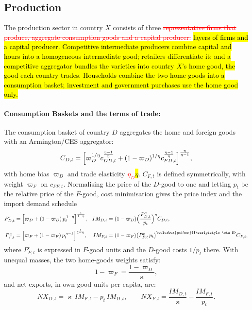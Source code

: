 \subsection{Production}
The production sector in country $X$ consists of three \textcolor{red}{\st{representative firms that produce, aggregate consumption goods and a capital producer.}} \hl{layers of firms and a capital producer. Competitive intermediate producers combine capital and hours into a homogeneous intermediate good; retailers differentiate it; and a competitive aggregator bundles the varieties into country $X$'s home good, the good each country trades. Households combine the two home goods into a consumption basket; investment and government purchases use the home good only.}
\paragraph{Consumption Baskets and the terms of trade:}
The consumption basket of country $D$ aggregates the home and foreign goods with an
Armington/CES aggregator:
\begin{equation}
C_{D,t}=\Bigl[\varpi_D^{1/\eta}c_{DD,t}^{\frac{\eta-1}{\eta}}
+(1-\varpi_D)^{1/\eta}c_{FD,t}^{\frac{\eta-1}{\eta}}\Bigr]^{\frac{\eta}{\eta-1}},
\label{eq:ces-aggregator}
\end{equation}
with home bias $\varpi_D$ and trade elasticity \textcolor{red}{\st{$\eta_D$}}\hl{$\eta$}. $C_{F,t}$ is defined
symmetrically, with weight $\varpi_F$ on $c_{FF,t}$. Normalising the price of the
$D$-good to one and letting $p_t$ be the relative price of the $F$-good, cost
minimisation gives the price index and the import demand schedule
\begin{align}
P^{c}_{D,t}&=\Bigl[\varpi_D+(1-\varpi_D)\,p_t^{\,1-\eta}\Bigr]^{\frac{1}{1-\eta}},
&
IM_{D,t}&=(1-\varpi_D)\Bigl(\frac{P^{c}_{D,t}}{p_t}\Bigr)^{\eta}C_{D,t},
\label{eq:ces-D}\\[3pt]
P^{c}_{F,t}&=\Bigl[\varpi_F+(1-\varpi_F)\,p_t^{\,\eta-1}\Bigr]^{\frac{1}{1-\eta}},
&
IM_{F,t}&=(1-\varpi_F)\bigl(P^{c}_{F,t}\,p_t\bigr)^{\colorbox{yellow}{$\scriptstyle\eta$}}C_{F,t},
\label{eq:ces-F}
\end{align}
where $P^{c}_{F,t}$ is expressed in $F$-good units and the $D$-good costs $1/p_t$
there. With unequal masses, the two home-goods weights satisfy:
\begin{equation}
1-\varpi_F=\frac{1-\varpi_D}{\varkappa},
\label{eq:home-bias-size}
\end{equation}
and net exports, in own-good units per capita, are:
\begin{equation}
NX_{D,t}=\varkappa\,IM_{F,t}-p_t\,IM_{D,t},
\qquad
NX_{F,t}=\frac{IM_{D,t}}{\varkappa}-\frac{IM_{F,t}}{p_t}.
\label{eq:nx}
\end{equation}

